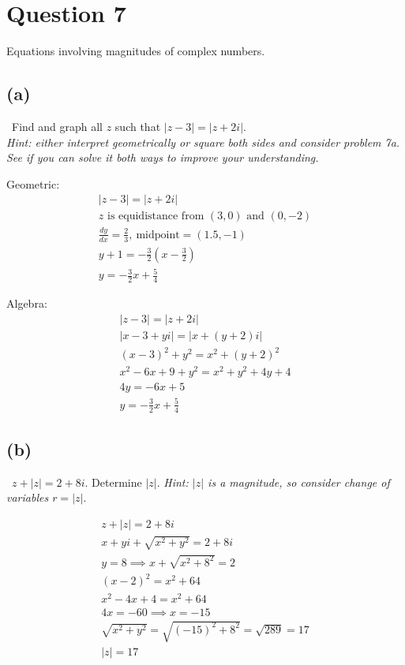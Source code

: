 \documentclass[12pt]{article}
\newcommand{\dydx}{\frac{dy}{dx}}
\begin{document}
\section{Question 7}
Equations involving magnitudes of complex numbers.

\vspace{0.3em}

\subsection{(a)} \, Find and graph all $z$ such that $|z-3|=|z+2i|$. \\
\textit{Hint: either interpret geometrically or square both sides and consider problem 7a. See if you can solve it both ways to improve your understanding.}

\vspace{0.3em}
Geometric:
\begin{gather*}
    |z-3|=|z+2i|\\
    z \text{ is equidistance from $(3,0)$ and $(0,-2)$}\\
    \dydx=\frac{2}{3}, \ \text{midpoint}=(1.5,-1)\\
    y+1=-\frac{3}{2}(x-\frac{3}{2})\\
    \boxed{y=-\frac{3}{2}x+\frac{5}{4}}
\end{gather*}

Algebra:
\begin{gather*}
    |z-3|=|z+2i|\\
    |x-3+yi|=|x+(y+2)i|\\
    (x-3)^2+y^2=x^2+(y+2)^2\\
    x^2-6x+9+y^2=x^2+y^2+4y+4\\
    4y=-6x+5\\
    \boxed{y=-\frac{3}{2}x+\frac{5}{4}}
\end{gather*}

\subsection{(b)} \,  $z + |z| = 2 + 8i$. Determine $|z|$. \textit{Hint: $|z|$ is a magnitude, so consider change of variables $r = |z|$}.

\begin{gather*}
    z + |z| = 2 + 8i\\
    x+yi+\sqrt{x^2+y^2}=2+8i\\
    y=8 \implies x+\sqrt{x^2+8^2}=2\\
    (x-2)^2=x^2+64\\
    x^2-4x+4=x^2+64\\
    4x=-60 \implies x=-15\\
    \sqrt{x^2+y^2}=\sqrt{(-15)^2+8^2}=\sqrt{289}=17\\
    \boxed{|z|=17}
\end{gather*}
\end{document}
